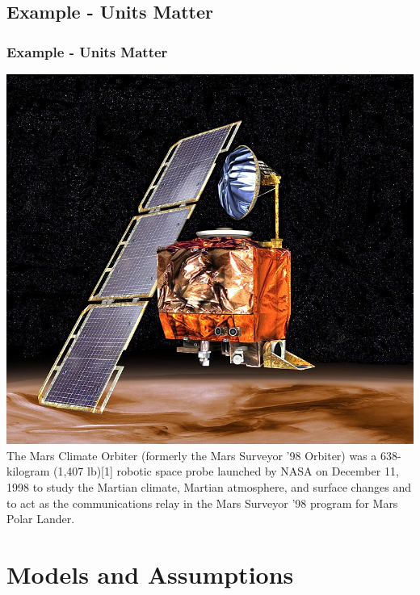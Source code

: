 \documentclass[fleqn]{beamer} %
\newcommand{\sectionIIItitle}{Models and Assumptions}
\newcommand{\sectionIIsubsectionIVtitle}{Example - Units Matter}
\begin{document}
		\subsection{\sectionIIsubsectionIVtitle}\label{sectionIIsubsectionIV}

			\begin{frame}
				\frametitle{\sectionIIsubsectionIVtitle}
				\bigskip
				\includegraphics[scale=.1]{images/mars_orbiter.jpg}
				The Mars Climate Orbiter (formerly the Mars Surveyor '98 Orbiter) was a 638-kilogram (1,407 lb)[1] robotic space probe launched by NASA on December 11, 1998 to study the Martian climate, Martian atmosphere, and surface changes and to act as the communications relay in the Mars Surveyor '98 program for Mars Polar Lander. 
		
			\end{frame}
		
	\section{\sectionIIItitle}\label{sectionIII}
\end{document}
